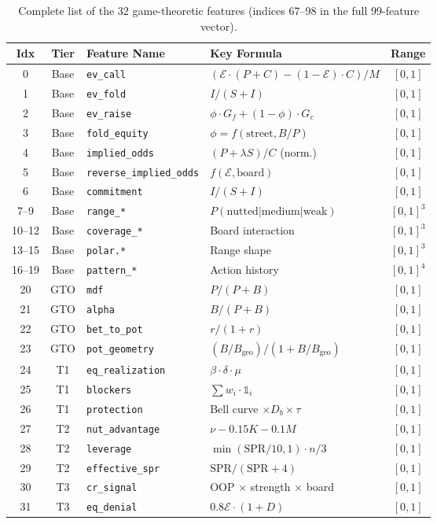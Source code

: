 \documentclass[11pt, a4paper]{article}
\theoremstyle{definition}
\begin{document}
\begin{table}[H]
\centering
\small
\begin{tabular}{ccllc}
\toprule
\textbf{Idx} & \textbf{Tier} & \textbf{Feature Name} & \textbf{Key Formula} & \textbf{Range} \\
\midrule
0 & Base & \texttt{ev\_call} & $(\mathcal{E} \cdot (P+C) - (1-\mathcal{E}) \cdot C) / M$ & $[0,1]$ \\
1 & Base & \texttt{ev\_fold} & $I / (S + I)$ & $[0,1]$ \\
2 & Base & \texttt{ev\_raise} & $\phi \cdot G_f + (1-\phi) \cdot G_c$ & $[0,1]$ \\
3 & Base & \texttt{fold\_equity} & $\phi = f(\text{street}, B/P)$ & $[0,1]$ \\
4 & Base & \texttt{implied\_odds} & $(P + \lambda S) / C$ (norm.) & $[0,1]$ \\
5 & Base & \texttt{reverse\_implied\_odds} & $f(\mathcal{E}, \text{board})$ & $[0,1]$ \\
6 & Base & \texttt{commitment} & $I / (S + I)$ & $[0,1]$ \\
7--9 & Base & \texttt{range\_*} & $P(\text{nutted}|\text{medium}|\text{weak})$ & $[0,1]^3$ \\
10--12 & Base & \texttt{coverage\_*} & Board interaction & $[0,1]^3$ \\
13--15 & Base & \texttt{polar.*} & Range shape & $[0,1]^3$ \\
16--19 & Base & \texttt{pattern\_*} & Action history & $[0,1]^4$ \\
\midrule
20 & GTO & \texttt{mdf} & $P / (P + B)$ & $[0,1]$ \\
21 & GTO & \texttt{alpha} & $B / (P + B)$ & $[0,1]$ \\
22 & GTO & \texttt{bet\_to\_pot} & $r / (1 + r)$ & $[0,1]$ \\
23 & GTO & \texttt{pot\_geometry} & $(B/B_{\text{geo}}) / (1 + B/B_{\text{geo}})$ & $[0,1]$ \\
\midrule
24 & T1 & \texttt{eq\_realization} & $\beta \cdot \delta \cdot \mu$ & $[0,1]$ \\
25 & T1 & \texttt{blockers} & $\sum w_i \cdot \mathbb{1}_i$ & $[0,1]$ \\
26 & T1 & \texttt{protection} & Bell curve $\times D_b \times \tau$ & $[0,1]$ \\
\midrule
27 & T2 & \texttt{nut\_advantage} & $\nu - 0.15K - 0.1M$ & $[0,1]$ \\
28 & T2 & \texttt{leverage} & $\min(\text{SPR}/10, 1) \cdot n/3$ & $[0,1]$ \\
29 & T2 & \texttt{effective\_spr} & $\text{SPR} / (\text{SPR} + 4)$ & $[0,1]$ \\
\midrule
30 & T3 & \texttt{cr\_signal} & OOP $\times$ strength $\times$ board & $[0,1]$ \\
31 & T3 & \texttt{eq\_denial} & $0.8\mathcal{E} \cdot (1 + D)$ & $[0,1]$ \\
\bottomrule
\end{tabular}
\caption{Complete list of the 32 game-theoretic features (indices 67--98 in the full 99-feature vector).}
\end{table}
\end{document}
